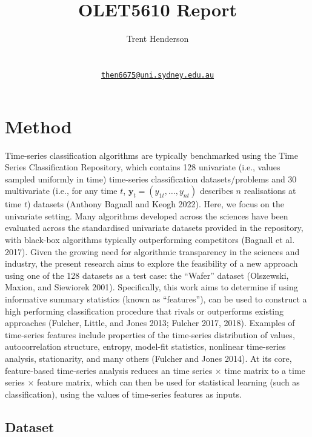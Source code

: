 \documentclass{article}
\title{OLET5610 Report}
\author{
    Trent Henderson
   \\
     \\
   \\
  \texttt{\href{mailto:then6675@uni.sydney.edu.au}{\nolinkurl{then6675@uni.sydney.edu.au}}} \\
  }
\renewenvironment{abstract}{}{}
\begin{document}
\maketitle

\def\tightlist{}


\begin{abstract}

\end{abstract}


\hypertarget{method}{%
\section{Method}\label{method}}

Time-series classification algorithms are typically benchmarked using the Time Series Classification Repository, which contains 128 univariate (i.e., values sampled uniformly in time) time-series classification datasets/problems and 30 multivariate (i.e., for any time \(t\), \(\mathbf{y}_{t} = (y_{1t},\ldots, y_{nt})\) describes \(n\) realisations at time \(t\)) datasets (Anthony Bagnall and Keogh 2022). Here, we focus on the univariate setting. Many algorithms developed across the sciences have been evaluated across the standardised univariate datasets provided in the repository, with black-box algorithms typically outperforming competitors (Bagnall et al. 2017). Given the growing need for algorithmic transparency in the sciences and industry, the present research aims to explore the feasibility of a new approach using one of the 128 datasets as a test case: the ``Wafer'' dataset (Olszewski, Maxion, and Siewiorek 2001). Specifically, this work aims to determine if using informative summary statistics (known as ``features''), can be used to construct a high performing classification procedure that rivals or outperforms existing approaches (Fulcher, Little, and Jones 2013; Fulcher 2017, 2018). Examples of time-series features include properties of the time-series distribution of values, autocorrelation structure, entropy, model-fit statistics, nonlinear time-series analysis, stationarity, and many others (Fulcher and Jones 2014). At its core, feature-based time-series analysis reduces an time series \(\times\) time matrix to a time series \(\times\) feature matrix, which can then be used for statistical learning (such as classification), using the values of time-series features as inputs.

\hypertarget{dataset}{%
\subsection{Dataset}\label{dataset}}
\end{document}
